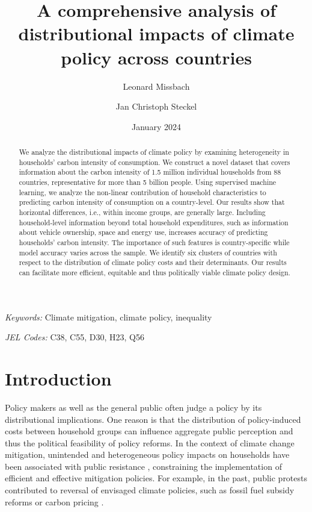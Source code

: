 \documentclass[12pt, a4paper]{article}
\title{A comprehensive analysis of distributional impacts of climate policy across countries
}
\author[1,2,*]{Leonard Missbach}
\author[1,3]{Jan Christoph Steckel}
\affil[1]{\small Mercator Research Institute on Global Commons and Climate Change, Berlin, Germany}
\affil[2]{\small Technical University of Berlin, Berlin, Germany}
\affil[3]{\small Brandenburg University of Technology Cottbus Senftenberg, Cottbus, Germany}
\affil[*]{\normalsize Corresponding author: \href{mailto:missbach@mcc-berlin.net}{missbach@mcc-berlin.net}}
\date{January 2024}
\begin{document}
\maketitle
\begin{abstract}
  We analyze the distributional impacts of climate policy by examining heterogeneity in households' carbon intensity of consumption. We construct a novel dataset that covers information about the carbon intensity of 1.5 million individual households from 88 countries, representative for more than 5 billion people. Using supervised machine learning, we analyze the non-linear contribution of household characteristics to predicting carbon intensity of consumption on a country-level.
   Our results show that horizontal differences, i.e., within income groups, are generally large. Including household-level information beyond total household expenditures, such as information about vehicle ownership, space and energy use, increases accuracy of predicting households' carbon intensity. The importance of such features is country-specific while model accuracy varies across the sample. We identify six clusters of countries with respect to the distribution of climate policy costs and their determinants. Our results can facilitate more efficient, equitable and thus politically viable climate policy design.   
\end{abstract}

\smallskip

\noindent \small \textit{Keywords:} Climate mitigation, climate policy, inequality

\noindent \small \textit{JEL Codes:} C38, C55, D30, H23, Q56

\thispagestyle{empty}
\clearpage
\setcounter{page}{1}

\normalsize

\section{Introduction} \label{sec:introduction}

Policy makers as well as the general public often judge a policy by its distributional implications. One reason is that the distribution of policy-induced costs between household groups can influence aggregate public perception and thus the political feasibility of policy reforms. In the context of climate change mitigation, unintended and heterogeneous policy impacts on households have been associated with public resistance \autocite{MaestreAndres.2019,Dechezlepretre.2022}, constraining the implementation of efficient and effective mitigation policies. For example, in the past, public protests contributed to reversal of envisaged climate policies, such as fossil fuel subsidy reforms \autocite{Clements.2013} or carbon pricing \autocite{Douenne.2020c}.
\end{document}
